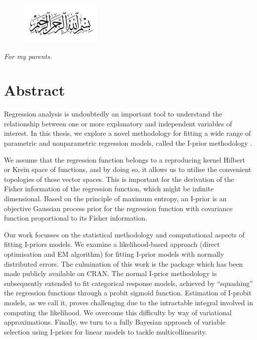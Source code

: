 \documentclass[11pt,twoside,openright,showframe]{report}
\begin{document}
\vspace*{5mm}
\begin{figure}[H]
  \centering
  \includegraphics[width=0.35\textwidth]{figure/bismillah}
\end{figure}
\vspace*{0.75cm}
\begin{center}
  \textit{For my parents.}
\end{center}

\chapter*{Abstract}

Regression analysis is undoubtedly an important tool to understand the relationship between one or more explanatory and independent variables of interest. 
In this thesis, we explore a novel methodology for fitting a wide range of parametric and nonparametric regression models, called the I-prior methodology \citep{bergsma2017}.

We assume that the regression function belongs to a reproducing kernel Hilbert or Kreĭn space of functions, and by doing so, it allows us to utilise the convenient topologies of these vector spaces. 
This is important for the derivation of the Fisher information of the regression function, which might be infinite dimensional.
Based on the principle of maximum entropy, an I-prior is an objective Gaussian process prior for the regression function with covariance function proportional to its Fisher information. 

Our work focusses on the statistical methodology and computational aspects of fitting I-priors models. 
We examine a likelihood-based approach (direct optimisation and EM algorithm) for fitting I-prior models with normally distributed errors.
The culmination of this work is the  package  \citep{jamil2017iprior} which has been made publicly available on CRAN. 
The normal I-prior methodology is subsequently extended to fit categorical response models, achieved by ``squashing'' the regression functions through a probit sigmoid function.
Estimation of I-probit models, as we call it, proves challenging due to the intractable integral involved in computing the likelihood. 
We overcome this difficulty by way of variational approximations.
Finally, we turn to a fully Bayesian approach of variable selection using I-priors for linear models to tackle multicollinearity.
\end{document}
